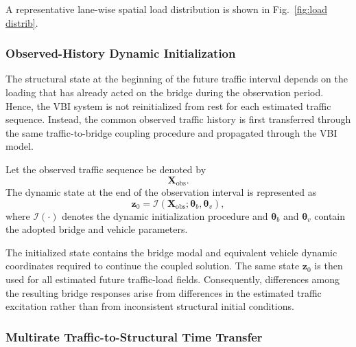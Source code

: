 \documentclass[journal]{IEEEtran}
\begin{document}
A representative lane-wise spatial load distribution is shown in Fig.~\ref{fig:load distrib}.

\subsubsection{Observed-History Dynamic Initialization}

The structural state at the beginning of the future traffic interval depends on the loading that has already acted on the bridge during the observation period. Hence, the VBI system is not reinitialized from rest for each estimated traffic sequence. Instead, the common observed traffic history is first transferred through the same traffic-to-bridge coupling procedure and propagated through the VBI model.

Let the observed traffic sequence be denoted by
\begin{equation}
\mathbf{X}_{\mathrm{obs}}.
\end{equation}
The dynamic state at the end of the observation interval is represented as
\begin{equation}
\mathbf{z}_{0}=\mathcal{I}\left(\mathbf{X}_{\mathrm{obs}};\boldsymbol{\theta}_{b},\boldsymbol{\theta}_{v}\right),
\end{equation}
where $\mathcal{I}(\cdot)$ denotes the dynamic initialization procedure and $\boldsymbol{\theta}_{b}$ and $\boldsymbol{\theta}_{v}$ contain the adopted bridge and vehicle parameters.

The initialized state contains the bridge modal and equivalent vehicle dynamic coordinates required to continue the coupled solution. The same state $\mathbf{z}_{0}$ is then used for all estimated future traffic-load fields. Consequently, differences among the resulting bridge responses arise from differences in the estimated traffic excitation rather than from inconsistent structural initial conditions.

\subsubsection{Multirate Traffic-to-Structural Time Transfer}
\end{document}
